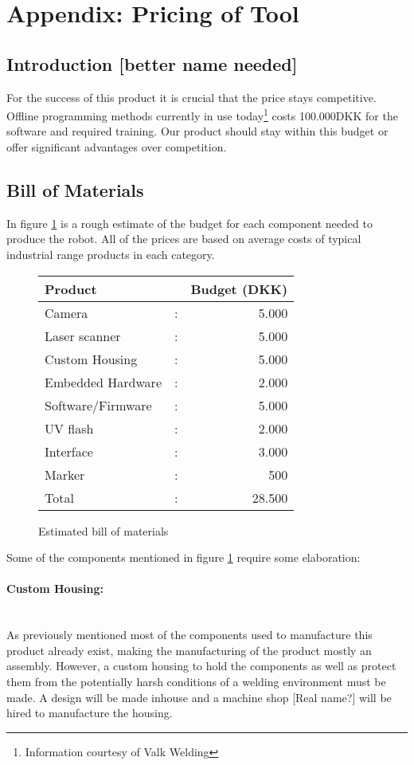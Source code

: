 
\section{Appendix: Pricing of Tool}
\subsection{Introduction [better name needed]}
For the success of this product it is crucial that the price stays competitive. Offline programming methods currently in use today\footnote{Information courtesy of Valk Welding} costs 100.000DKK for the software and required training. Our product should stay within this budget or offer significant advantages over competition.
\subsection{Bill of Materials}
In figure \ref{tab:BoM} is a rough estimate of the budget for each component needed to produce the robot. All of the prices are based on average costs of typical industrial range products in each category.  
\begin{figure}[h!]
\label{tab:BoM}
	\begin{center}
		\begin{tabular}{l c r}
		Product            & & Budget (DKK)\\
		\hline
		Camera 				& : & 5.000  \\
		Laser scanner		& : & 5.000 \\
		Custom Housing		& : & 5.000\\
		Embedded Hardware	& : & 2.000\\
		Software/Firmware	& : & 5.000\\
		UV flash			& : & 2.000\\
		Interface			& : & 3.000\\
		Marker				& : & 500\\[0.2cm]
		\hline
		Total				& : & 28.500\\ 
		\end{tabular}
	\end{center}
	\caption{Estimated bill of materials}
\end{figure}
Some of the components mentioned in figure \ref{tab:BoM} require some elaboration:
\paragraph{Custom Housing:}~\\
As previously mentioned most of the components used to manufacture this product already exist, making the manufacturing of the product mostly an assembly. However, a custom housing to hold the components as well as protect them from the potentially harsh conditions of a welding environment must be made. A design will be made inhouse and a machine shop [Real name?] will be hired to manufacture the housing.
